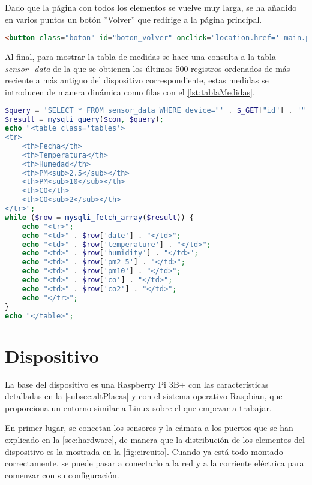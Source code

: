 Dado que la página con todos los elementos se vuelve muy larga, se ha añadido en varios puntos un botón ''Volver'' que redirige a la página principal.
\begin{lstlisting}[language=HTML, caption=Botón de retorno a página principal, label=lst:botonVolver]
<button class="boton" id="boton_volver" onclick="location.href=' main.php'">Volver</button>
\end{lstlisting}

Al final, para mostrar la tabla de medidas se hace una consulta a la tabla \textit{sensor\_data} de la que se obtienen los últimos 500 registros ordenados de más reciente a más antiguo del dispositivo correspondiente, estas medidas se introducen de manera dinámica como filas con el \autoref{lst:tablaMedidas}.
\begin{lstlisting}[language=PHP, caption=Visualización tabular de las medidas del dispositivo, label=lst:tablaMedidas]
$query = 'SELECT * FROM sensor_data WHERE device="' . $_GET["id"] . '" ORDER BY date DESC LIMIT 500';
$result = mysqli_query($con, $query);
echo "<table class='tables'>
<tr>
    <th>Fecha</th>
    <th>Temperatura</th>
    <th>Humedad</th>
    <th>PM<sub>2.5</sub></th>
    <th>PM<sub>10</sub></th>
    <th>CO</th>
    <th>CO<sub>2</sub></th>
</tr>";
while ($row = mysqli_fetch_array($result)) {
    echo "<tr>";
    echo "<td>" . $row['date'] . "</td>";
    echo "<td>" . $row['temperature'] . "</td>";
    echo "<td>" . $row['humidity'] . "</td>";
    echo "<td>" . $row['pm2_5'] . "</td>";
    echo "<td>" . $row['pm10'] . "</td>";
    echo "<td>" . $row['co'] . "</td>";
    echo "<td>" . $row['co2'] . "</td>";
    echo "</tr>";
}
echo "</table>";
\end{lstlisting}

\section{Dispositivo}\label{sec:implDispositivo}
La base del dispositivo es una Raspberry Pi 3B+ con las características detalladas en la \autoref{subsec:altPlacas} y con el sistema operativo Raspbian, que proporciona un entorno similar a Linux sobre el que empezar a trabajar.

En primer lugar, se conectan los sensores y la cámara a los puertos que se han explicado en la \autoref{sec:hardware}, de manera que la distribución de los elementos del dispositivo es la mostrada en la \autoref{fig:circuito}. Cuando ya está todo montado correctamente, se puede pasar a conectarlo a la red y a la corriente eléctrica para comenzar con su configuración.

